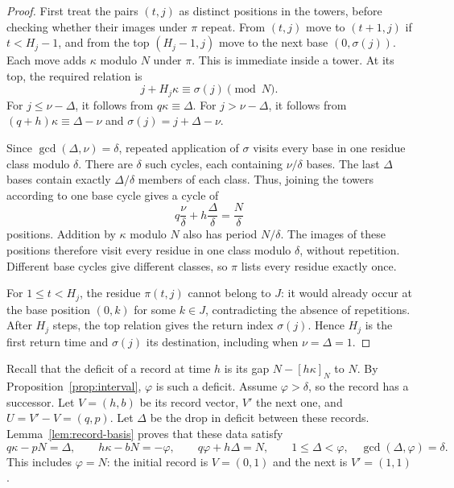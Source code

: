\documentclass[11pt,a4paper]{article}
\theoremstyle{definition}
\theoremstyle{remark}
\numberwithin{equation}{section}
\begin{document}
\begin{proof}
First treat the pairs $(t,j)$ as distinct positions in the towers, before checking whether their images under $\pi$ repeat. From $(t,j)$ move to $(t+1,j)$ if $t<H_j-1$, and from the top $(H_j-1,j)$ move to the next base $(0,\sigma(j))$. Each move adds $\kappa$ modulo $N$ under $\pi$. This is immediate inside a tower. At its top, the required relation is
\[
 j+H_j\kappa\equiv\sigma(j)\pmod N.
\]
For $j\le\nu-\Delta$, it follows from $q\kappa\equiv\Delta$. For $j>\nu-\Delta$, it follows from $(q+h)\kappa\equiv\Delta-\nu$ and $\sigma(j)=j+\Delta-\nu$.

Since $\gcd(\Delta,\nu)=\delta$, repeated application of $\sigma$ visits every base in one residue class modulo $\delta$. There are $\delta$ such cycles, each containing $\nu/\delta$ bases. The last $\Delta$ bases contain exactly $\Delta/\delta$ members of each class. Thus, joining the towers according to one base cycle gives a cycle of
\[
 q\frac{\nu}{\delta}+h\frac{\Delta}{\delta}=\frac N\delta
\]
positions. Addition by $\kappa$ modulo $N$ also has period $N/\delta$. The images of these positions therefore visit every residue in one class modulo $\delta$, without repetition. Different base cycles give different classes, so $\pi$ lists every residue exactly once.

For $1\le t<H_j$, the residue $\pi(t,j)$ cannot belong to $J$: it would already occur at the base position $(0,k)$ for some $k\in J$, contradicting the absence of repetitions. After $H_j$ steps, the top relation gives the return index $\sigma(j)$. Hence $H_j$ is the first return time and $\sigma(j)$ its destination, including when $\nu=\Delta=1$.
\end{proof}

Recall that the deficit of a record at time $h$ is its gap $N-[h\kappa]_N$ to $N$. By Proposition~\ref{prop:interval}, $\varphi$ is such a deficit. Assume $\varphi>\delta$, so the record has a successor. Let $V=(h,b)$ be its record vector, $V'$ the next one, and $U=V'-V=(q,p)$. Let $\Delta$ be the drop in deficit between these records. Lemma~\ref{lem:record-basis} proves that these data satisfy
\begin{equation}\label{eq:tower-data}
 q\kappa-pN=\Delta,\qquad h\kappa-bN=-\varphi,
 \qquad q\varphi+h\Delta=N,\qquad
 1\le\Delta<\varphi,\quad\gcd(\Delta,\varphi)=\delta.
\end{equation}
This includes $\varphi=N$: the initial record is $V=(0,1)$ and the next is $V'=(1,1)$.
\end{document}
